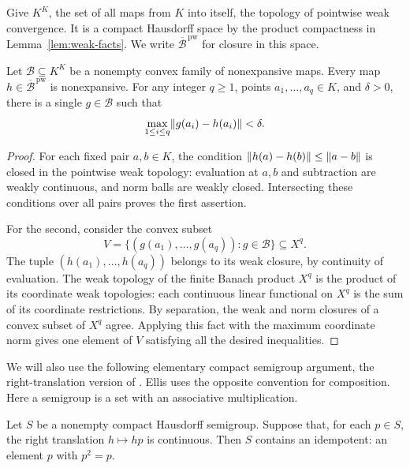 Give $K^K$, the set of all maps from $K$ into itself, the topology of
pointwise weak convergence.  It is a compact Hausdorff space by the
product compactness in Lemma~\ref{lem:weak-facts}.  We write
$\overline{\mathcal B}^{\,\mathrm{pw}}$ for closure in this space.

\begin{lemma}
\label{lem:finite-tuples}
Let $\mathcal B\subseteq K^K$ be a nonempty convex family of
nonexpansive maps.  Every map
$h\in\overline{\mathcal B}^{\,\mathrm{pw}}$ is nonexpansive.
For any integer $q\geq1$, points $a_1,\ldots,a_q\in K$, and
$\delta>0$, there is a single
$g\in\mathcal B$ such that
\[
 \max_{1\leq i\leq q}\lVert g(a_i)-h(a_i)\rVert<\delta.
\]
\end{lemma}

\begin{proof}
For each fixed pair $a,b\in K$, the condition
$\lVert h(a)-h(b)\rVert\leq\lVert a-b\rVert$ is closed in the pointwise weak
topology: evaluation at $a,b$ and subtraction are weakly continuous,
and norm balls are weakly closed.  Intersecting these conditions over
all pairs proves the first assertion.

For the second, consider the convex subset
\[
 V=\{(g(a_1),\ldots,g(a_q)):g\in\mathcal B\}\subseteq X^q.
\]
The tuple $(h(a_1),\ldots,h(a_q))$ belongs to its weak closure, by
continuity of evaluation.  The weak topology of the finite Banach
product $X^q$ is the product of its coordinate weak topologies: each
continuous linear functional on $X^q$ is the sum of its coordinate
restrictions.  By separation, the weak and norm closures of a convex
subset of $X^q$ agree.  Applying this fact with the maximum coordinate
norm gives one element of $V$ satisfying all the desired inequalities.
\end{proof}

We will also use the following elementary compact semigroup argument,
the right-translation version of \citet[Lemma~1, p.~402]{Ellis1958}.
Ellis uses the opposite convention for composition.
Here a semigroup is a set with an associative multiplication.

\begin{lemma}
\label{lem:idempotent}
Let $S$ be a nonempty compact Hausdorff semigroup.  Suppose that, for
each $p\in S$, the right translation $h\mapsto hp$ is continuous.
Then $S$ contains an idempotent: an element $p$ with $p^2=p$.
\end{lemma}

